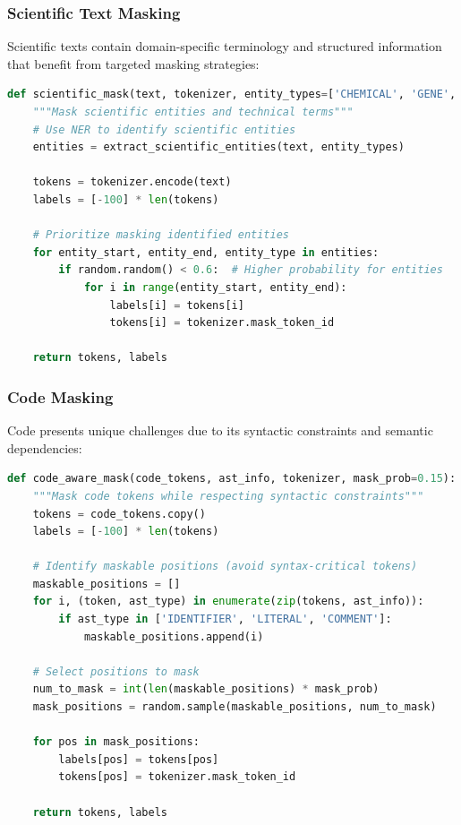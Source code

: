 \subsubsection{Scientific Text Masking}

Scientific texts contain domain-specific terminology and structured information that benefit from targeted masking strategies:

\begin{lstlisting}[language=Python, caption=Scientific text masking]
def scientific_mask(text, tokenizer, entity_types=['CHEMICAL', 'GENE', 'DISEASE']):
    """Mask scientific entities and technical terms"""
    # Use NER to identify scientific entities
    entities = extract_scientific_entities(text, entity_types)
    
    tokens = tokenizer.encode(text)
    labels = [-100] * len(tokens)
    
    # Prioritize masking identified entities
    for entity_start, entity_end, entity_type in entities:
        if random.random() < 0.6:  # Higher probability for entities
            for i in range(entity_start, entity_end):
                labels[i] = tokens[i]
                tokens[i] = tokenizer.mask_token_id
    
    return tokens, labels
\end{lstlisting}

\subsubsection{Code Masking}

Code presents unique challenges due to its syntactic constraints and semantic dependencies:

\begin{lstlisting}[language=Python, caption=Code-aware masking]
def code_aware_mask(code_tokens, ast_info, tokenizer, mask_prob=0.15):
    """Mask code tokens while respecting syntactic constraints"""
    tokens = code_tokens.copy()
    labels = [-100] * len(tokens)
    
    # Identify maskable positions (avoid syntax-critical tokens)
    maskable_positions = []
    for i, (token, ast_type) in enumerate(zip(tokens, ast_info)):
        if ast_type in ['IDENTIFIER', 'LITERAL', 'COMMENT']:
            maskable_positions.append(i)
    
    # Select positions to mask
    num_to_mask = int(len(maskable_positions) * mask_prob)
    mask_positions = random.sample(maskable_positions, num_to_mask)
    
    for pos in mask_positions:
        labels[pos] = tokens[pos]
        tokens[pos] = tokenizer.mask_token_id
    
    return tokens, labels
\end{lstlisting}

